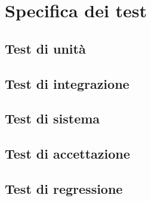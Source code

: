 \chapter{Specifica dei test}\label{specifica-dei-test}

\section{Test di unità}

\section{Test di integrazione}

\section{Test di sistema}

\section{Test di accettazione}

\section{Test di regressione}